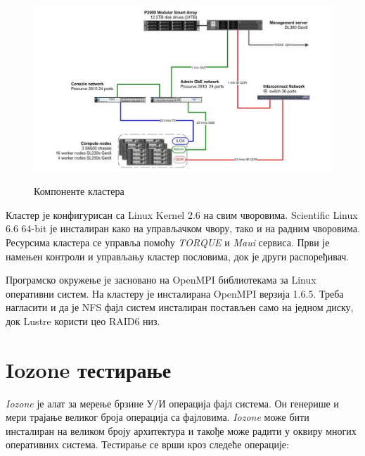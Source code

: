  \begin{figure}[h!]
   \centering
       \includegraphics[width=1\textwidth]{slike/medflow.png}\\[1cm]
   \caption{Компоненте кластера}
 \end{figure}
 
Кластер је конфигурисан са Linux Kernel 2.6 на свим чворовима. Scientific Linux 6.6 64-bit је инсталиран како на управљачком чвору, тако и на радним чворовима. Ресурсима кластера се управља помоћу \textit{TORQUE} и \textit{Maui} сервиса. Први је намењен контроли и управљању кластер пословима, док је други распоређивач. 
 
Програмско окружење је засновано на OpenMPI библиотекама за Linux оперативни систем. На кластеру је инсталирана OpenMPI верзија 1.6.5. Треба нагласити и да је NFS фајл систем инсталиран постављен само на једном диску, док Lustre користи цео RAID6 низ. 

\section{Iozone тестирање}
\textit{Iozone} је алат за мерење брзине У/И операција фајл система. Он генерише и мери трајање великог броја операција са фајловима. \textit{Iozone} може бити  инсталиран на великом броју архитектура и такође може радити у оквиру многих оперативних система. Тестирање се врши кроз следеће операције:

